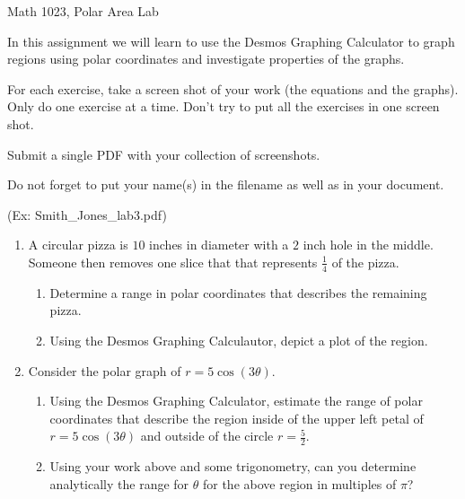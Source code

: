 \documentclass[12pt]{article}
\begin{document}
\begin{large}
\noindent Math 1023, Polar Area Lab
\end{large} \newline
\noindent In this assignment we will learn to use the Desmos Graphing Calculator to graph regions using polar coordinates and investigate properties of the graphs. \newline
 
\noindent For each exercise, take a screen shot of your work (the equations and the graphs).  Only do one exercise at a time. Don’t try to put all the exercises in one screen shot. \newline

\noindent Submit a single PDF with your collection of screenshots. \newline

\noindent Do not forget to put your name(s) in the filename as well as in your document. \newline

\noindent (Ex: Smith\_Jones\_lab3.pdf)

\begin{enumerate}
	\item A circular pizza is $10$ inches in diameter with a $2$ inch hole in the middle.  Someone then removes one slice that that represents $\frac{1}{4}$ of the pizza.
	\begin{enumerate}
		\item Determine a range in polar coordinates that describes the remaining pizza.
		\item Using the Desmos Graphing Calculautor, depict a plot of the region.
	\end{enumerate}
	
	\item Consider the polar graph of $\displaystyle r = 5 \cos(3 \theta)$.
	\begin{enumerate}
		\item Using the Desmos Graphing Calculator, estimate the range of polar coordinates that describe the region inside of the upper left petal of $\displaystyle r = 5 \cos(3 \theta)$ and outside of the circle $r = \displaystyle \frac{5}{2}$.
		\item Using your work above and some trigonometry, can you determine analytically the range for $\theta$ for the above region in multiples of $\pi$?

	\end{enumerate}		
	
	
	
\end{enumerate}
\end{document}
